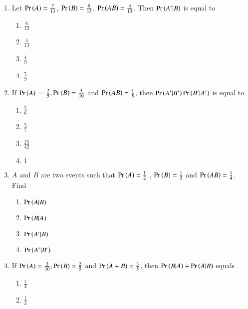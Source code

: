 \begin{enumerate}[label=\thesubsection.\arabic*,ref=\thesubsection.\theenumi,resume*]
\item Let $\Pr\left(A\right) = \frac{7}{13}$, $\Pr\left(B\right) = \frac{9}{13}$, $\Pr\left(AB\right) = \frac{4}{13}$. Then $\Pr\left(A^{\prime}|B\right)$ is equal to
\begin{multicols}{4}
\begin{enumerate}
\item $\frac{6}{13}$
\item $\frac{4}{13}$
\item $\frac{4}{9}$
\item $\frac{5}{9}$
\end{enumerate}
\end{multicols}
\solution

\item If $\Pr\left(A\right)$ = $\frac{2}{5}, \Pr\left(B\right) = \frac{3}{10}$ and $\Pr\left(AB\right) = \frac{1}{5}$, then $\Pr\left(A^{\prime}|B^{\prime}\right)\Pr\left(B^{\prime}|A^{\prime}\right)$ is equal to 
\begin{multicols}{4}
\begin{enumerate}
\item 
$\frac{5}{6}$
\item 
$\frac{5}{7}$
\item 
$\frac{25}{42}$
\item 
$1$
\end{enumerate}
\end{multicols}
\solution

\item $A$ and $B$ are two events such that $\Pr\left(A\right)= \frac{1}{2}$ , $\Pr\left(B\right)= \frac{1}{3}$ and $\Pr\left(AB\right)= \frac{1}{4}$. Find
\begin{multicols}{4}
\begin{enumerate}
\item $\Pr\left(A|B\right)$  \item $\Pr\left(B|A\right)$  \item $\Pr\left(A^{\prime}|B\right)$  \item $\Pr\left(A^{\prime}|B^{\prime}\right)$
\end{enumerate}
\end{multicols}
\solution

\item If $\Pr\left(A\right) = \frac{3}{10}, \Pr\left(B\right) = \frac{2}{5}$ and $\Pr\left(A+B\right) = \frac{3}{5}$, then $\Pr\left( B | A\right) + \Pr\left( A | B\right) $ equals
\begin{multicols}{4}
\begin{enumerate}
	\item $\frac{1}{4}$ 
	\item $\frac{1}{3}$ 

\end{enumerate}
\end{multicols}
\end{enumerate}
